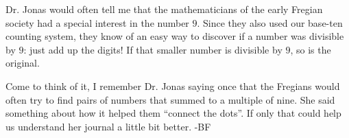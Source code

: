 Dr. Jonas would often tell me that the mathematicians of the early Fregian
society had a special interest in the number \(9\). Since they also
used our base-ten counting system, they know of an easy way to
discover if a number was divisible by \(9\): just add up the digits!
If that smaller number is divisible by \(9\), so is the original.

Come to think of it, I remember Dr. Jonas saying once that the Fregians
would often try to find pairs of numbers that summed to a multiple
of nine. She said something about how it helped them
``connect the dots''. If only that could help us understand
her journal a little bit better. -BF

%
%


